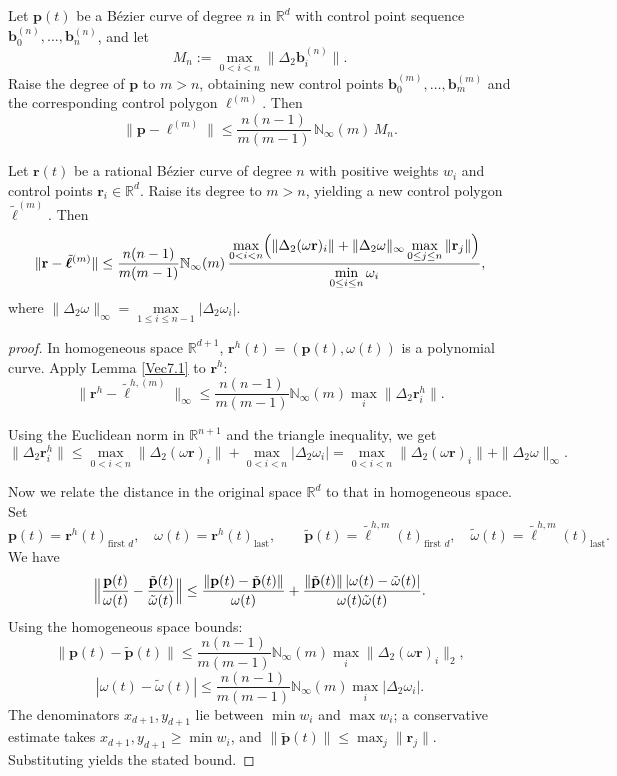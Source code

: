 \documentclass[10pt,a4paper]{amsart}
\begin{document}
\begin{Theorem} \label{Vec7.1}
  Let $\mathbf{p}(t)$ be a B\'ezier curve of degree $n$ in $\mathbb{R}^d$ with control point sequence $\mathbf{b}^{(n)}_0,\dots,\mathbf{b}^{(n)}_n$, and let
  \[
  M_n:=\max_{0<i<n}\|\Delta_2\mathbf{b}^{(n)}_i\|.
  \]
  Raise the degree of $\mathbf{p}$ to $m>n$, obtaining new control points $\mathbf{b}^{(m)}_0,\dots,\mathbf{b}^{(m)}_m$ and the corresponding control polygon $\bm{\ell}^{(m)}$. Then
  \[
  \|\mathbf{p}-\bm{\ell}^{(m)}\|\le \frac{n(n-1)}{m(m-1)}\,\mathbb{N}_{\infty}(m)\,M_n.
  \]
\end{Theorem}

\begin{Theorem}
  Let $\mathbf{r}(t)$ be a rational B\'ezier curve of degree $n$ with positive weights $w_i$ and control points $\mathbf{r}_i\in\mathbb{R}^d$. Raise its degree to $m>n$, yielding a new control polygon $\tilde{\bm{\ell}}^{(m)}$. Then
  \[
  \|\mathbf{r}-\tilde{\bm{\ell}}^{(m)}\|\le\frac{n(n-1)}{m(m-1)}\mathbb{N}_{\infty}(m)\,
  \frac{\displaystyle\max_{0<i<n}\Bigl(\|\Delta_2(\omega\mathbf{r})_i\|+\|\Delta_2 \omega\|_\infty\max_{0 \le j \le n}\|\mathbf{r}_j\|\Bigr)}{\displaystyle\min_{0\le i\le n}\omega_i},
  \]
  where  $\|\Delta_2 \omega\|_\infty=\max\limits_{1\le i\le n-1}|\Delta_2 \omega_i|$.
\end{Theorem}

\begin{proof}[proof]
  In homogeneous space $\mathbb{R}^{d+1}$, $\mathbf{r}^h(t) = \left(\mathbf{p}(t), \omega (t)\right)$ is a polynomial curve. Apply Lemma \ref{Vec7.1} to $\mathbf{r}^h$:
  \[
  \|\mathbf{r}^h-\tilde{\bm{\ell}}^{h,(m)}\|_\infty\le\frac{n(n-1)}{m(m-1)}\mathbb{N}_{\infty}(m)\max_i\|\Delta_2\mathbf{r}_i^h\|.
  \]
  
  Using the Euclidean norm in $\mathbb{R}^{n+1}$ and the triangle inequality, we get
\[
\|\Delta_2\mathbf{r}_i^h\|
\le \max_{0<i<n}\|\Delta_2(\omega\mathbf{r})_i\| + \max_{0<i<n}|\Delta_2 \omega_i|
= \max_{0<i<n}\|\Delta_2(\omega\mathbf{r})_i\| + \|\Delta_2 \omega\|_{\infty}.
\]
  
  Now we relate the distance in the original space $\mathbb{R}^d$ to that in homogeneous space.
  Set
\[
\mathbf{p}(t)=\mathbf{r}^h(t)_{\text{first }d}, \quad  \omega(t)=\mathbf{r}^h(t)_{\text{last}},
\qquad
\tilde{\mathbf{p}}(t)=\tilde{\bm{\ell}}^{h,m}(t)_{\text{first }d},\quad \tilde{\omega}(t)= \tilde{\bm{\ell}}^{h,m}(t)_{\text{last}}.
\]
  We have
  \[
  \Bigl\|\frac{\mathbf{p}(t)}{\omega(t)}-\frac{\tilde{\mathbf{p}}(t)}{\tilde{\omega}(t)}\Bigr\|
  \le\frac{\|\mathbf{p}(t)-{\tilde{\mathbf{p}}(t)}\|}{\omega(t)}+\frac{\|{\tilde{\mathbf{p}}(t)}\|\,|\omega(t)-\tilde{\omega}(t)|}{\omega(t)\tilde{\omega}(t)}.
  \]
  Using the homogeneous space bounds:
  \[
  \|\mathbf{p}(t)-\tilde{\mathbf{p}}(t)\|\le\frac{n(n-1)}{m(m-1)}\mathbb{N}_{\infty}(m)\max_i\|\Delta_2(\omega\mathbf{r})_i\|_2,
  \]
  \[
  |\omega(t)-\tilde{\omega}(t)|\le\frac{n(n-1)}{m(m-1)}\mathbb{N}_{\infty}(m)\max_i|\Delta_2 \omega_i|.
  \]
  The denominators $x_{d+1},y_{d+1}$ lie between $\min w_i$ and $\max w_i$; a conservative estimate takes $x_{d+1},y_{d+1}\ge\min w_i$, and $\|\tilde{\mathbf{p}}(t)\|\le\max_j\|\mathbf{r}_j\|$. Substituting yields the stated bound.
\end{proof}
\end{document}
